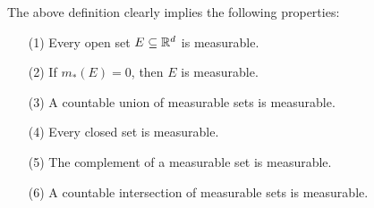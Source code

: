 \documentclass[12pt, a4paper, openany, twoside]{book}
\theoremstyle{definition}
\theoremstyle{remark}
\theoremstyle{plain}
\numberwithin{equation}{section}
\begin{document}
The above definition clearly implies the following properties:

\vspace{5mm}
\begin{tcolorbox}[colback=yellow!10!white,colframe=brown!75!black,title=Proposition 1.3.1]\label{Proposition 1.3.1}
    \begin{enumerate}
        \item [(1)] Every open set $E\subseteq{\mathbb {R}}^d$ is measurable.
        \item [(2)] If $m_*(E)=0$, then $E$ is measurable. 
        \item [(3)] A countable union of measurable sets is measurable.
        \item [(4)] Every closed set is measurable.
        \item [(5)] The complement of a measurable set is measurable.
        \item [(6)] A countable intersection of measurable sets is measurable.
    \end{enumerate}
\end{tcolorbox}
\end{document}
